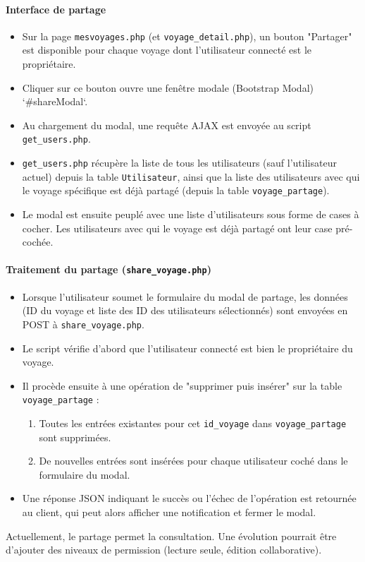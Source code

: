 \documentclass[a4paper,12pt]{article}
\begin{document}
\paragraph{Interface de partage}
\begin{itemize}
    \item Sur la page \texttt{mesvoyages.php} (et \texttt{voyage\_detail.php}), un bouton "Partager" est disponible pour chaque voyage dont l'utilisateur connecté est le propriétaire.
    \item Cliquer sur ce bouton ouvre une fenêtre modale (Bootstrap Modal) `\#shareModal`.
    \item Au chargement du modal, une requête AJAX est envoyée au script \texttt{get\_users.php}.
    \item \texttt{get\_users.php} récupère la liste de tous les utilisateurs (sauf l'utilisateur actuel) depuis la table \texttt{Utilisateur}, ainsi que la liste des utilisateurs avec qui le voyage spécifique est déjà partagé (depuis la table \texttt{voyage\_partage}).
    \item Le modal est ensuite peuplé avec une liste d'utilisateurs sous forme de cases à cocher. Les utilisateurs avec qui le voyage est déjà partagé ont leur case pré-cochée.
\end{itemize}

\paragraph{Traitement du partage (\texttt{share\_voyage.php})}
\begin{itemize}
    \item Lorsque l'utilisateur soumet le formulaire du modal de partage, les données (ID du voyage et liste des ID des utilisateurs sélectionnés) sont envoyées en POST à \texttt{share\_voyage.php}.
    \item Le script vérifie d'abord que l'utilisateur connecté est bien le propriétaire du voyage.
    \item Il procède ensuite à une opération de "supprimer puis insérer" sur la table \texttt{voyage\_partage} :
        \begin{enumerate}
            \item Toutes les entrées existantes pour cet \texttt{id\_voyage} dans \texttt{voyage\_partage} sont supprimées.
            \item De nouvelles entrées sont insérées pour chaque utilisateur coché dans le formulaire du modal.
        \end{enumerate}
    \item Une réponse JSON indiquant le succès ou l'échec de l'opération est retournée au client, qui peut alors afficher une notification et fermer le modal.
\end{itemize}
Actuellement, le partage permet la consultation. Une évolution pourrait être d'ajouter des niveaux de permission (lecture seule, édition collaborative).
\end{document}
